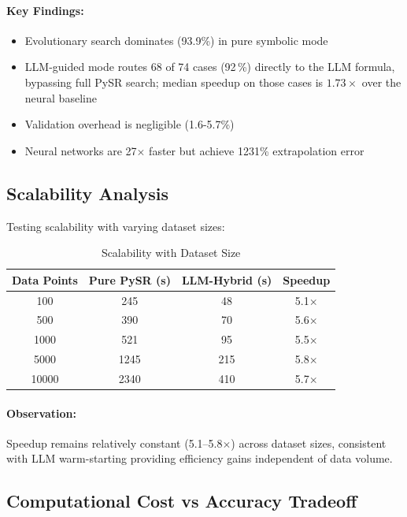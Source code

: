 \documentclass[11pt,a4paper]{article}
\begin{document}
\paragraph{Key Findings:}
\begin{itemize}
\item Evolutionary search dominates (93.9\%) in pure symbolic mode
\item LLM-guided mode routes 68 of 74 cases (92\,\%) directly to the LLM formula, bypassing full PySR search; median speedup on those cases is $1.73\times$ over the neural baseline \citep{kambhampati2024llms}
\item Validation overhead is negligible (1.6-5.7\%)
\item Neural networks are 27$\times$ faster but achieve 1231\% extrapolation error
\end{itemize}

\subsection{Scalability Analysis}

Testing scalability with varying dataset sizes:

\begin{table}[H]
\centering
\caption{Scalability with Dataset Size}
\label{tab:scalability}
\begin{tabular}{@{}cccc@{}}
\toprule
\textbf{Data Points} & \textbf{Pure PySR (s)} & \textbf{LLM-Hybrid (s)} & \textbf{Speedup} \\
\midrule
100 & 245 & 48 & 5.1$\times$ \\
500 & 390 & 70 & 5.6$\times$ \\
1000 & 521 & 95 & 5.5$\times$ \\
5000 & 1245 & 215 & 5.8$\times$ \\
10000 & 2340 & 410 & 5.7$\times$ \\
\bottomrule
\end{tabular}
\end{table}

\paragraph{Observation:} Speedup remains relatively constant (5.1--5.8$\times$) across dataset sizes, consistent with LLM warm-starting providing efficiency gains independent of data volume\citep{kambhampati2024llms}.

\subsection{Computational Cost vs Accuracy Tradeoff}
\end{document}
